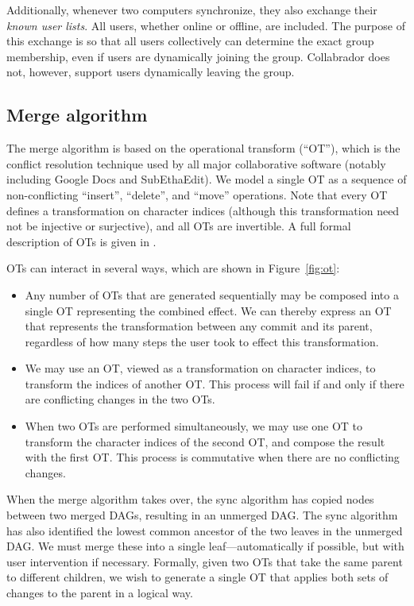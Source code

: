 \documentclass[11pt,titlepage]{article}
\begin{document}
Additionally, whenever two computers synchronize, they also exchange
their \emph{known user lists}. All users, whether online or offline,
are included. The purpose of this exchange is so that all users
collectively can determine the exact group membership, even if users
are dynamically joining the group. Collabrador does not, however,
support users dynamically leaving the group.

\subsection{Merge algorithm}
\label{sec:merge}

The merge algorithm is based on the operational transform (``OT''),
which is the conflict resolution technique used by all major
collaborative software (notably including Google Docs and
SubEthaEdit).  We model a single OT as a sequence of non-conflicting
``insert'', ``delete'', and ``move'' operations.  Note that every OT
defines a transformation on character indices (although this
transformation need not be injective or surjective), and all OTs are
invertible.  A full formal description of OTs is given in \cite{wave}.

OTs can interact in several ways, which are shown in
Figure~\ref{fig:ot}:
\begin{itemize}
\item Any number of OTs that are generated sequentially may be
  composed into a single OT representing the combined effect.  We can
  thereby express an OT that represents the transformation between any
  commit and its parent, regardless of how many steps the user took to
  effect this transformation.
\item We may use an OT, viewed as a transformation on character
  indices, to transform the indices of another OT.  This process will
  fail if and only if there are conflicting changes in the two OTs.
\item When two OTs are performed simultaneously, we may use one OT to
  transform the character indices of the second OT, and compose the
  result with the first OT.  This process is commutative when there
  are no conflicting changes.
\end{itemize}

When the merge algorithm takes over, the sync algorithm has copied
nodes between two merged DAGs, resulting in an unmerged DAG.  The sync
algorithm has also identified the lowest common ancestor of the two
leaves in the unmerged DAG.  We must merge these into a single
leaf---automatically if possible, but with user intervention if
necessary. Formally, given two OTs that take the same parent to
different children, we wish to generate a single OT that applies both
sets of changes to the parent in a logical way.
\end{document}
